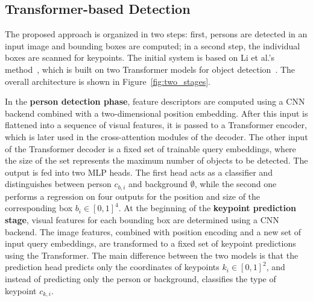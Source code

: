 \documentclass[sigconf]{acmart}
\begin{document}
\subsection{Transformer-based Detection}\label{sec:detection}

The proposed approach is organized in two steps: 
first, persons are detected in an input image and bounding boxes are computed; in a second step, the individual boxes are scanned for keypoints. 
The initial system is based on Li et al.'s method~\cite{DBLP:conf/cvpr/0012WZXXT21}, which is built on two Transformer models for object detection~\cite{DBLP:conf/nips/VaswaniSPUJGKP17, DBLP:conf/eccv/CarionMSUKZ20}. 
The overall architecture is shown in Figure~\ref{fig:two_stages}.

In the \textbf{person detection phase}, feature descriptors are computed using a \ac{CNN} backend combined with a two-dimensional position embedding. 
After this input is flattened into a sequence of visual features, it is passed to a Transformer encoder, which is later used in the cross-attention modules of the decoder. 
The other input of the Transformer decoder is a fixed set of trainable query embeddings, where the size of the set represents the maximum number of objects to be detected. 
The output is fed into two \ac{MLP} heads. 
The first head acts as a classifier and distinguishes between person $c_{b,i}$ and background $\emptyset$, while the second one performs a regression on four outputs for the position and size of the corresponding box $b_i \in [0,1]^4$. 
At the beginning of the \textbf{keypoint prediction stage}, visual features for each bounding box are determined using a \ac{CNN} backend. 
The image features, combined with position encoding and a new set of input query embeddings, are transformed to a fixed set of keypoint predictions using the Transformer. 
The main difference between the two models is that the prediction head predicts only the coordinates of keypoints $k_i \in [0,1]^2$, and instead of predicting only the person or background, classifies the type of keypoint $c_{k,i}$.
\end{document}
